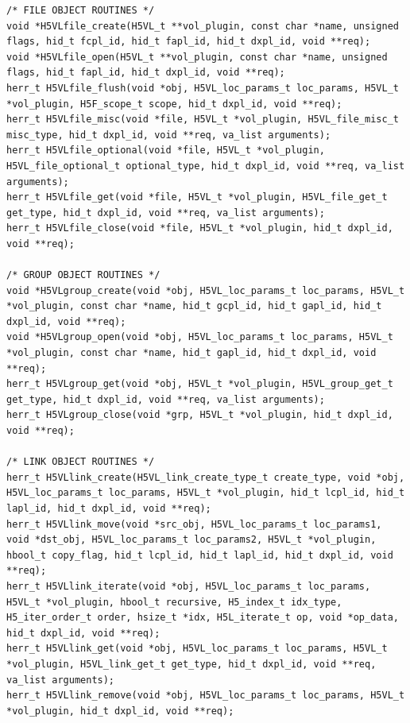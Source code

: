 \begin{lstlisting}
/* FILE OBJECT ROUTINES */
void *H5VLfile_create(H5VL_t **vol_plugin, const char *name, unsigned flags, hid_t fcpl_id, hid_t fapl_id, hid_t dxpl_id, void **req);
void *H5VLfile_open(H5VL_t **vol_plugin, const char *name, unsigned flags, hid_t fapl_id, hid_t dxpl_id, void **req);
herr_t H5VLfile_flush(void *obj, H5VL_loc_params_t loc_params, H5VL_t *vol_plugin, H5F_scope_t scope, hid_t dxpl_id, void **req);
herr_t H5VLfile_misc(void *file, H5VL_t *vol_plugin, H5VL_file_misc_t misc_type, hid_t dxpl_id, void **req, va_list arguments);
herr_t H5VLfile_optional(void *file, H5VL_t *vol_plugin,
H5VL_file_optional_t optional_type, hid_t dxpl_id, void **req, va_list arguments);
herr_t H5VLfile_get(void *file, H5VL_t *vol_plugin, H5VL_file_get_t get_type, hid_t dxpl_id, void **req, va_list arguments);
herr_t H5VLfile_close(void *file, H5VL_t *vol_plugin, hid_t dxpl_id, void **req);

/* GROUP OBJECT ROUTINES */
void *H5VLgroup_create(void *obj, H5VL_loc_params_t loc_params, H5VL_t
*vol_plugin, const char *name, hid_t gcpl_id, hid_t gapl_id, hid_t dxpl_id, void **req);
void *H5VLgroup_open(void *obj, H5VL_loc_params_t loc_params, H5VL_t
*vol_plugin, const char *name, hid_t gapl_id, hid_t dxpl_id, void
**req);
herr_t H5VLgroup_get(void *obj, H5VL_t *vol_plugin, H5VL_group_get_t get_type, hid_t dxpl_id, void **req, va_list arguments);
herr_t H5VLgroup_close(void *grp, H5VL_t *vol_plugin, hid_t dxpl_id, void **req);

/* LINK OBJECT ROUTINES */
herr_t H5VLlink_create(H5VL_link_create_type_t create_type, void *obj,
H5VL_loc_params_t loc_params, H5VL_t *vol_plugin, hid_t lcpl_id, hid_t
lapl_id, hid_t dxpl_id, void **req);
herr_t H5VLlink_move(void *src_obj, H5VL_loc_params_t loc_params1,
void *dst_obj, H5VL_loc_params_t loc_params2, H5VL_t *vol_plugin,
hbool_t copy_flag, hid_t lcpl_id, hid_t lapl_id, hid_t dxpl_id, void **req);
herr_t H5VLlink_iterate(void *obj, H5VL_loc_params_t loc_params,
H5VL_t *vol_plugin, hbool_t recursive, H5_index_t idx_type,
H5_iter_order_t order, hsize_t *idx, H5L_iterate_t op, void *op_data, hid_t dxpl_id, void **req);
herr_t H5VLlink_get(void *obj, H5VL_loc_params_t loc_params, H5VL_t
*vol_plugin, H5VL_link_get_t get_type, hid_t dxpl_id, void **req, va_list arguments);
herr_t H5VLlink_remove(void *obj, H5VL_loc_params_t loc_params, H5VL_t
*vol_plugin, hid_t dxpl_id, void **req);


\end{lstlisting}

